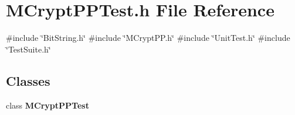 \section{M\+Crypt\+P\+P\+Test.\+h File Reference}
\label{MCryptPPTest_8h}
{\ttfamily \#include \char`\"{}Bit\+String.\+h\char`\"{}}\newline
{\ttfamily \#include \char`\"{}M\+Crypt\+P\+P.\+h\char`\"{}}\newline
{\ttfamily \#include \char`\"{}Unit\+Test.\+h\char`\"{}}\newline
{\ttfamily \#include \char`\"{}Test\+Suite.\+h\char`\"{}}\newline
\subsection*{Classes}
\begin{DoxyCompactItemize}
\item 
class \textbf{ M\+Crypt\+P\+P\+Test}
\end{DoxyCompactItemize}
